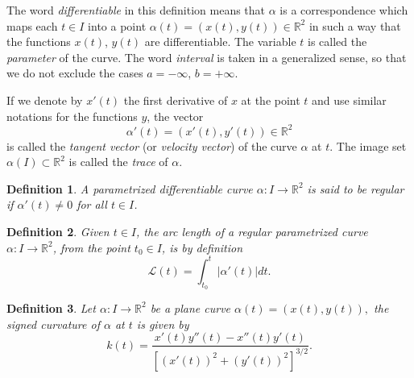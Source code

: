 \documentclass{amsart}
\theoremstyle{plain}
\newtheorem{definition}{\bf Definition}
\numberwithin{equation}{section}
\begin{document}
\noindent The word \textit{differentiable} in this definition means that $\alpha$ is a correspondence which maps each $t \in I$ into a point $ \alpha(t) = (x(t), y(t)) \in \mathbb{R}^2 $ in such a way that the functions $x(t)$, $y(t)$ are differentiable. The variable $t$ is called the \textit{parameter} of the curve. The word \textit{interval} is taken in a generalized sense, so that we do not exclude the cases $a = -\infty$, $b = +\infty$.

If we denote by $x'(t)$ the first derivative of $x$ at the point $t$ and use similar notations for the functions $y$, the vector 
\[
\alpha'(t) = (x'(t), y'(t))  \in \mathbb{R}^2
\]
is called the \textit{tangent vector} (or \textit{velocity vector}) of the curve $\alpha$ at $t$. The image set $\alpha(I) \subset \mathbb{R}^2$ is called the \textit{trace} of $\alpha$. 

\begin{definition}
	A parametrized differentiable curve $\alpha: I \longrightarrow \mathbb{R}^2$ is said to be regular if $\alpha'(t)\neq 0$ for all $t \in I$.
\end{definition}

\begin{definition}
	Given $t \in I$, the arc length of a regular parametrized curve $\alpha: I \longrightarrow \mathbb{R}^2$, from the point $t_0 \in I$, is by definition
	\begin{equation}\label{definicao comprimento}
		\mathcal{L}(t) = \int_{t_0}^t |\alpha'(t)|dt.
	\end{equation}
\end{definition}


\begin{definition}
	Let $\alpha: I \longrightarrow \mathbb{R}^2$ be a plane curve $\alpha(t)=(x(t), y(t)),$ the signed curvature of $\alpha$ at $t$ is given by
	\begin{equation}\label{definicao curvatura}
		k(t) = \dfrac{x'(t) y''(t) - x''(t) y'(t)}{[ (x'(t))^2 + (y'(t))^2 ]^{3/2}}.   
	\end{equation}
\end{definition}
\end{document}
